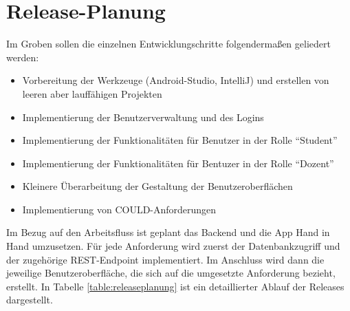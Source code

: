 \chapter{Release-Planung}
Im Groben sollen die einzelnen Entwicklungschritte folgendermaßen geliedert werden:
\begin{itemize}
	\item Vorbereitung der Werkzeuge (Android-Studio, IntelliJ) und erstellen von leeren aber lauffähigen Projekten
	\item Implementierung der Benutzerverwaltung und des Logins
	\item Implementierung der Funktionalitäten für Benutzer in der Rolle \enquote{Student}
	\item Implementierung der Funktionalitäten für Bentuzer in der Rolle \enquote{Dozent}
	\item Kleinere Überarbeitung der Gestaltung der Benutzeroberflächen
	\item Implementierung von COULD-Anforderungen
\end{itemize}
Im Bezug auf den Arbeitsfluss ist geplant das Backend und die App Hand in Hand umzusetzen. 
Für jede Anforderung wird zuerst der Datenbankzugriff und der zugehörige REST-Endpoint implementiert.
Im Anschluss wird dann die jeweilige Benutzeroberfläche, die sich auf die umgesetzte Anforderung bezieht, erstellt.
In Tabelle \ref{table:releaseplanung} ist ein detaillierter Ablauf der Releases dargestellt.

